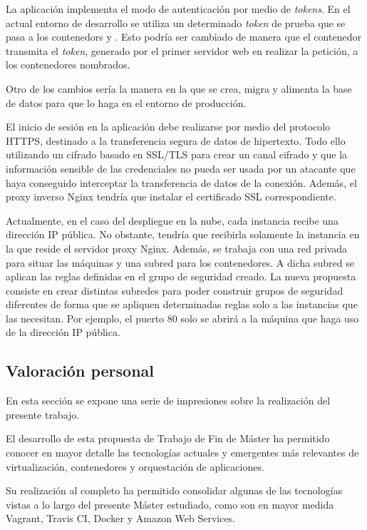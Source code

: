 La aplicación implementa el modo de autenticación por medio de \textit{tokens}. En el actual entorno de desarrollo se utiliza un determinado \textit{token} de prueba que se pasa a los contenedors  y . Esto podría ser cambiado de manera que el contenedor  transmita el \textit{token}, generado por el primer servidor web en realizar la petición, a los contenedores nombrados.

Otro de los cambios sería la manera en la que se crea, migra y alimenta la base de datos para que lo haga en el entorno de producción. 

El inicio de sesión en la aplicación debe realizarse por medio del protocolo HTTPS, destinado a la transferencia segura de datos de hipertexto. Todo ello utilizando un cifrado basado en SSL/TLS para crear un canal cifrado y que la información sensible de las credenciales no pueda ser usada por un atacante que haya conseguido interceptar la transferencia de datos de la conexión. Además, el proxy inverso Nginx tendría que instalar el certificado SSL correspondiente.

Actualmente, en el caso del despliegue en la nube, cada instancia recibe una dirección IP pública. No obstante, tendría que recibirla solamente la instancia en la que reside el servidor proxy Nginx. Además, se trabaja con una red privada para situar las máquinas y una subred para los contenedores. A dicha subred se aplican las reglas definidas en el grupo de seguridad creado. La nueva propuesta consiste en crear distintas subredes para poder construir grupos de seguridad diferentes de forma que se apliquen determinadas reglas solo a las instancias que las necesitan. Por ejemplo, el puerto 80 solo se abrirá a la máquina que haga uso de la dirección IP pública.

\subsection{Valoración personal}

En esta sección se expone una serie de impresiones sobre la realización del presente trabajo.

El desarrollo de esta propuesta de Trabajo de Fin de Máster ha permitido conocer en mayor detalle las tecnologías actuales y emergentes más relevantes de virtualización, contenedores y orquestación de aplicaciones.

Su realización al completo ha permitido consolidar algunas de las tecnologías vistas a lo largo del presente Máster estudiado, como son en mayor medida Vagrant, Travis CI, Docker y Amazon Web Services.

